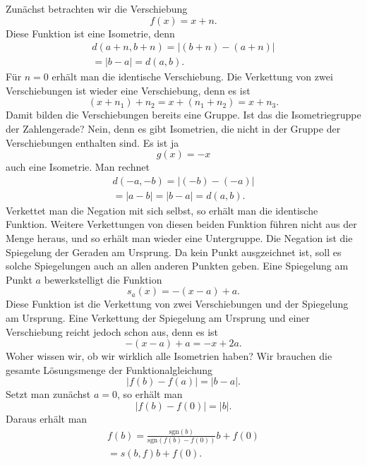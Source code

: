 \documentclass[a4paper,11pt,fleqn,twocolumn,twoside]{article}
\begin{document}
Zunächst betrachten wir die Verschiebung
\begin{equation}
f(x) = x+n.
\end{equation}
Diese Funktion ist eine Isometrie, denn
\begin{gather}
d(a+n,b+n) = |(b+n)-(a+n)|\\
= |b-a| = d(a,b).
\end{gather}
Für $n=0$ erhält man die identische Verschiebung.
Die Verkettung von zwei Verschiebungen ist wieder
eine Verschiebung, denn es ist
\begin{equation}
(x+n_1)+n_2 = x+(n_1+n_2) = x+n_3.
\end{equation}
Damit bilden die Verschiebungen bereits eine Gruppe.
Ist das die Isometriegruppe der Zahlengerade? Nein, denn es gibt
Isometrien, die nicht in der Gruppe der Verschiebungen enthalten
sind. Es ist ja
\begin{equation}
g(x) = -x
\end{equation}
auch eine Isometrie. Man rechnet
\begin{gather}
d(-a,-b) = |(-b)-(-a)|\\
= |a-b| = |b-a| = d(a,b).
\end{gather}
Verkettet man die Negation mit sich selbst, so erhält man die
identische Funktion. Weitere Verkettungen von diesen beiden Funktion
führen nicht aus der Menge heraus, und so erhält man wieder eine
Untergruppe. Die Negation ist die Spiegelung der Geraden am Ursprung.
Da kein Punkt ausgzeichnet ist, soll es solche Spiegelungen auch an
allen anderen Punkten geben. Eine Spiegelung am Punkt $a$
bewerkstelligt die Funktion
\begin{equation}
s_a(x) = -(x-a)+a.
\end{equation}
Diese Funktion ist die Verkettung von zwei Verschiebungen und der
Spiegelung am Ursprung. Eine Verkettung der Spiegelung am Ursprung
und einer Verschiebung reicht jedoch schon aus, denn es ist
\begin{equation}
-(x-a)+a = -x+2a.
\end{equation}
Woher wissen wir, ob wir wirklich alle Isometrien haben?
Wir brauchen die gesamte Lösungsmenge der Funktionalgleichung
\begin{equation}
|f(b)-f(a)| = |b-a|.
\end{equation}
Setzt man zunächst $a=0$, so erhält man
\begin{equation}
|f(b)-f(0)|=|b|.
\end{equation}
Daraus erhält man
\begin{gather}
f(b) = \frac{\mathrm{sgn}(b)}{\mathrm{sgn}(f(b)-f(0))} b+f(0)\\
= s(b,f)b+f(0).
\end{gather}
\end{document}
